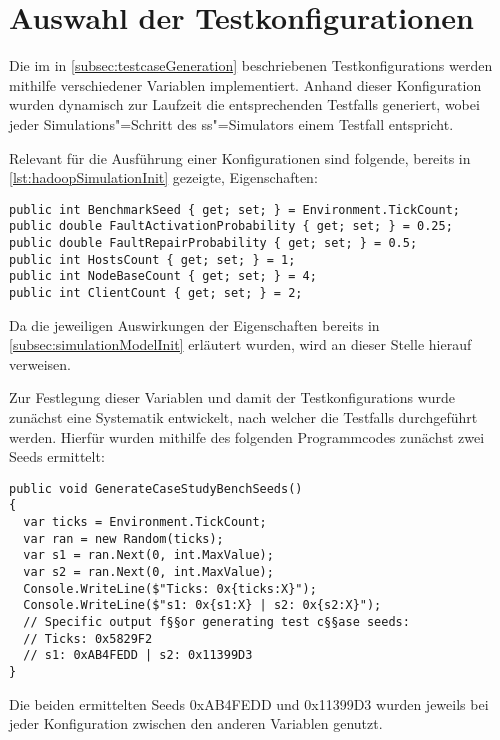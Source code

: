 \section{Auswahl der Testkonfigurationen}
\label{sec:selectTestcases}

Die im in \cref{subsec:testcaseGeneration} beschriebenen \glspl{Testkonfiguration} werden mithilfe verschiedener Variablen implementiert.
Anhand dieser Konfiguration wurden dynamisch zur Laufzeit die entsprechenden \glspl{Testfall} generiert, wobei jeder Simulations"=Schritt des \gls{ss}"=Simulators einem \gls{Testfall} entspricht.

Relevant für die Ausführung einer Konfigurationen sind folgende, bereits in \cref{lst:hadoopSimulationInit} gezeigte, Eigenschaften:

\begin{lstlisting}[label=lst:hadoopTest,style=cs,
caption={Zur Definition einer \gls{Testkonfiguration} relevante Felder}]
public int BenchmarkSeed { get; set; } = Environment.TickCount;
public double FaultActivationProbability { get; set; } = 0.25;
public double FaultRepairProbability { get; set; } = 0.5;
public int HostsCount { get; set; } = 1;
public int NodeBaseCount { get; set; } = 4;
public int ClientCount { get; set; } = 2;
\end{lstlisting}

Da die jeweiligen Auswirkungen der Eigenschaften bereits in \cref{subsec:simulationModelInit} erläutert wurden, wird an dieser Stelle hierauf verweisen.

Zur Festlegung dieser Variablen und damit der \glspl{Testkonfiguration} wurde zunächst eine Systematik entwickelt, nach welcher die \glspl{Testfall} durchgeführt werden.
Hierfür wurden mithilfe des folgenden Programmcodes zunächst zwei Seeds ermittelt:

\begin{lstlisting}[label=lst:generateTestCaseSeeds,style=cs,
caption={Ermittlung der für die \glspl{Testkonfiguration} genutzten Basisseeds}]
public void GenerateCaseStudyBenchSeeds()
{
  var ticks = Environment.TickCount;
  var ran = new Random(ticks);
  var s1 = ran.Next(0, int.MaxValue);
  var s2 = ran.Next(0, int.MaxValue);
  Console.WriteLine($"Ticks: 0x{ticks:X}");
  Console.WriteLine($"s1: 0x{s1:X} | s2: 0x{s2:X}");
  // Specific output f§§or generating test c§§ase seeds:
  // Ticks: 0x5829F2
  // s1: 0xAB4FEDD | s2: 0x11399D3
}
\end{lstlisting}

Die beiden ermittelten Seeds 0xAB4FEDD und 0x11399D3 wurden jeweils bei jeder Konfiguration zwischen den anderen Variablen genutzt.

